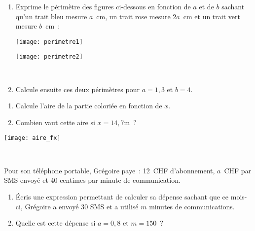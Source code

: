 

\begin{exercice}[Périmètres]
\begin{enumerate}
 \item Exprime le périmètre des figures ci-dessous en fonction de $a$ et de $b$ sachant qu'un trait bleu mesure $a$ cm, un trait rose mesure $2a$ cm et un trait vert mesure $b$ cm :
 
\begin{minipage}[c]{0.48\linewidth}
 \begin{center} \texttt{[image: perimetre1]} \end{center}
 \end{minipage} \hfill%
 \begin{minipage}[c]{0.48\linewidth}
  \begin{center} \texttt{[image: perimetre2]} \end{center} 
  \end{minipage} \\
 \item Calcule ensuite ces deux périmètres pour $a = 1,3$ et $b = 4$.
 \end{enumerate}
\end{exercice}


\begin{exercice}
\begin{minipage}[c]{0.48\linewidth}
 \begin{enumerate}
  \item Calcule l'aire de la partie coloriée en fonction de $x$.
  \item Combien vaut cette aire si $x = 14,7 \text{m}$ ?
  \end{enumerate}
 \end{minipage} \hfill%
 \begin{minipage}[c]{0.48\linewidth}
\texttt{[image: aire\_fx]}
  \end{minipage} \\
\end{exercice}


\begin{exercice}
Pour son téléphone portable, Grégoire paye : 12 CHF d'abonnement, $a$ CHF par SMS envoyé et 40 centimes par minute de communication. 
\begin{enumerate}
 \item Écris une expression permettant de calculer sa dépense sachant que ce mois-ci, Grégoire a envoyé 30 SMS et a utilisé $m$ minutes de communications.
 \item Quelle est cette dépense si $a = 0,8$ et $m = 150$ ?
 \end{enumerate}
\end{exercice}


